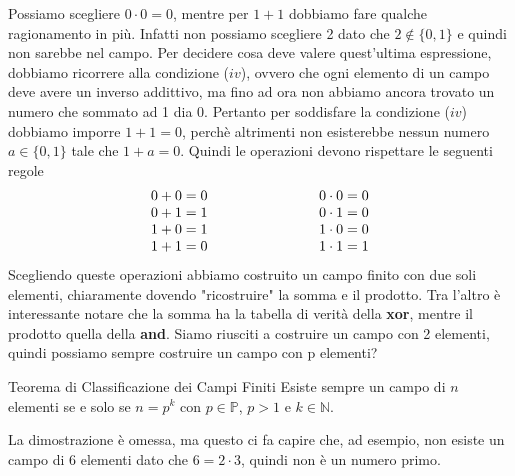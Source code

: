 \documentclass{rapport}
\begin{document}
Possiamo scegliere $ 0 \cdot 0 =0$, mentre per $1 + 1$ dobbiamo fare qualche ragionamento in più. Infatti non possiamo scegliere 2 dato che $2\notin \{0,1\}$ e quindi non sarebbe nel campo. Per decidere cosa deve valere quest'ultima espressione, dobbiamo ricorrere alla condizione ($iv$), ovvero che ogni elemento di un campo deve avere un inverso addittivo, ma fino ad ora non abbiamo ancora trovato un numero che sommato ad 1 dia 0. Pertanto per soddisfare la condizione ($iv$) dobbiamo imporre $1+1=0$, perchè altrimenti non esisterebbe nessun numero $a\in \{0,1\}$ tale che $1+a = 0$. Quindi le operazioni devono rispettare le seguenti regole
\[
\begin{array}{c@{\qquad}@{\qquad}@{\qquad}@{\qquad}c}
  0 + 0 = 0 &  0 \cdot 0 = 0 \\
  0 + 1 = 1 &  0 \cdot 1 = 0 \\
  1 + 0 = 1 &  1 \cdot 0 = 0 \\
  1 + 1 = 0 &  1 \cdot 1 = 1 \\ 
\end{array}
\]
Scegliendo queste operazioni abbiamo costruito un campo finito con due soli elementi, chiaramente dovendo "ricostruire" la somma e il prodotto. Tra l'altro è interessante notare che la somma ha la tabella di verità della \textbf{xor}, mentre il prodotto quella della \textbf{and}.  
\newpage
Siamo riusciti a costruire un campo con 2 elementi, quindi possiamo sempre costruire un campo con p elementi?
\begin{teorema}{Teorema di Classificazione dei Campi Finiti}{}
  Esiste sempre un campo di $n$ elementi se e solo se $n=p^k$ con $p\in \mathbb{P}$, $p>1$ e $k \in \mathbb{N}$.
  \end{teorema} 
La dimostrazione è omessa, ma questo ci fa capire che, ad esempio, non esiste un campo di 6 elementi dato che $6=2\cdot3$, quindi non è un numero primo.
\end{document}
